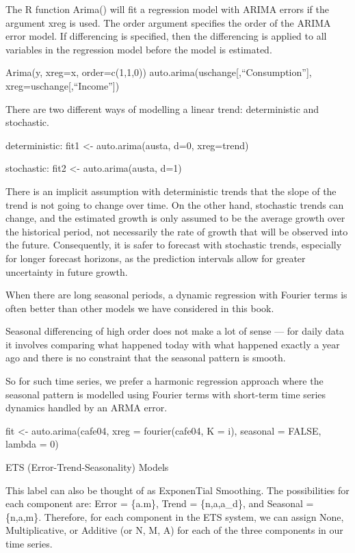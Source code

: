 \documentclass[]{book}
\theoremstyle{definition}
\theoremstyle{definition}
\theoremstyle{definition}
\theoremstyle{remark}
\begin{document}
The R function Arima() will fit a regression model with ARIMA errors if
the argument xreg is used. The order argument specifies the order of the
ARIMA error model. If differencing is specified, then the differencing
is applied to all variables in the regression model before the model is
estimated.

Arima(y, xreg=x, order=c(1,1,0))
auto.arima(uschange{[},``Consumption''{]},
xreg=uschange{[},``Income''{]})

There are two different ways of modelling a linear trend: deterministic
and stochastic.

deterministic: fit1 \textless{}- auto.arima(austa, d=0, xreg=trend)

stochastic: fit2 \textless{}- auto.arima(austa, d=1)

There is an implicit assumption with deterministic trends that the slope
of the trend is not going to change over time. On the other hand,
stochastic trends can change, and the estimated growth is only assumed
to be the average growth over the historical period, not necessarily the
rate of growth that will be observed into the future. Consequently, it
is safer to forecast with stochastic trends, especially for longer
forecast horizons, as the prediction intervals allow for greater
uncertainty in future growth.

When there are long seasonal periods, a dynamic regression with Fourier
terms is often better than other models we have considered in this book.

Seasonal differencing of high order does not make a lot of sense --- for
daily data it involves comparing what happened today with what happened
exactly a year ago and there is no constraint that the seasonal pattern
is smooth.

So for such time series, we prefer a harmonic regression approach where
the seasonal pattern is modelled using Fourier terms with short-term
time series dynamics handled by an ARMA error.

fit \textless{}- auto.arima(cafe04, xreg = fourier(cafe04, K = i),
seasonal = FALSE, lambda = 0)

ETS (Error-Trend-Seasonality) Models

This label can also be thought of as ExponenTial Smoothing. The
possibilities for each component are: Error = \{a.m\}, Trend =
\{n,a,a\_d\}, and Seasonal = \{n,a,m\}. Therefore, for each component in
the ETS system, we can assign None, Multiplicative, or Additive (or N,
M, A) for each of the three components in our time series.
\end{document}

